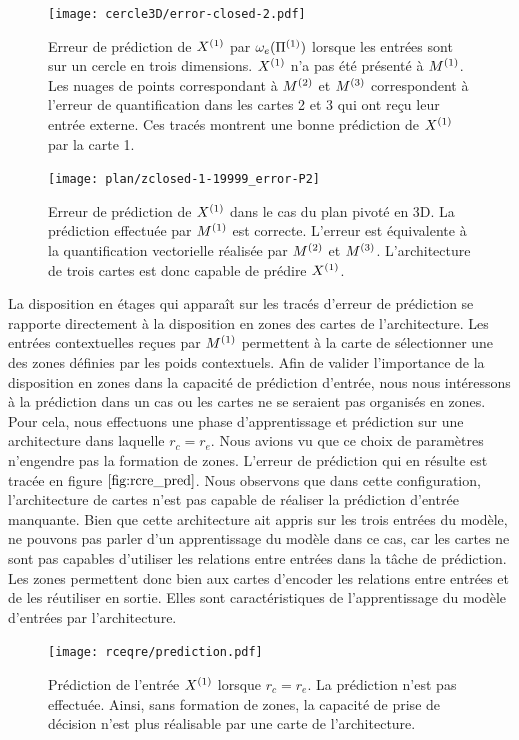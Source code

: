\documentclass[../main]{subfiles}
\begin{document}
\begin{figure}
	\texttt{[image: cercle3D/error-closed-2.pdf]}
	\caption{Erreur de prédiction de $X^{({1})}$ par $\omega_e(\Pi^{({1})})$ lorsque les entrées sont sur un cercle en trois dimensions. $X^{({1})}$ n'a pas été présenté à $M^{({1})}$.
	 Les nuages de points correspondant à $M^{({2})}$ et $M^{({3})}$ correspondent à l'erreur de quantification dans les cartes 2 et 3 qui ont reçu leur entrée externe. Ces tracés montrent une bonne prédiction de $X^{({1})}$ par la carte 1. \label{fig:pred_cercle}}
\end{figure}

\begin{figure}
	\texttt{[image: plan/zclosed-1-19999\_error-P2]}	
	\caption{Erreur de prédiction de $X^{({1})}$ dans le cas du plan pivoté en 3D. La prédiction effectuée par $M^{({1})}$ est correcte. L'erreur est équivalente à la quantification vectorielle réalisée par $M^{({2})}$ et $M^{({3})}$. L'architecture de trois cartes est donc capable de prédire $X^{({1})}$. \label{fig:plan3_pred}}
\end{figure}

La disposition en étages qui apparaît sur les tracés d'erreur de prédiction se rapporte directement à la disposition en zones des cartes de l'architecture. Les entrées contextuelles reçues par $M^{({1})}$ permettent à la carte de sélectionner une des zones définies par les poids contextuels.
Afin de valider l'importance de la disposition en zones dans la capacité de prédiction d'entrée, nous nous intéressons à la prédiction dans un cas ou les cartes ne se seraient pas organisés en zones.
Pour cela, nous effectuons une phase d'apprentissage et prédiction sur une architecture dans laquelle $r_c = r_e$. 
Nous avions vu que ce choix de paramètres n'engendre pas la formation de zones. L'erreur de prédiction qui en résulte est tracée en figure $\ref{fig:rcre_pred}$.
Nous observons que dans cette configuration, l'architecture de cartes n'est pas capable de réaliser la prédiction d'entrée manquante.
Bien que cette architecture ait appris sur les trois entrées du modèle, ne pouvons pas parler d'un apprentissage du modèle dans ce cas, car les cartes ne sont pas capables d'utiliser les relations entre entrées dans la tâche de prédiction.
Les zones permettent donc bien aux cartes d'encoder les relations entre entrées et de les réutiliser en sortie. Elles sont caractéristiques de l'apprentissage du modèle d'entrées par l'architecture.

\begin{figure}
	\centering\texttt{[image: rceqre/prediction.pdf]}
	\caption{Prédiction de l'entrée $X^{({1})}$ lorsque $r_c = r_e$. La prédiction n'est pas effectuée. Ainsi, sans formation de zones, la capacité de prise de décision n'est plus réalisable par une carte de l'architecture. \label{fig:rcre_pred}}
\end{figure}
\end{document}
